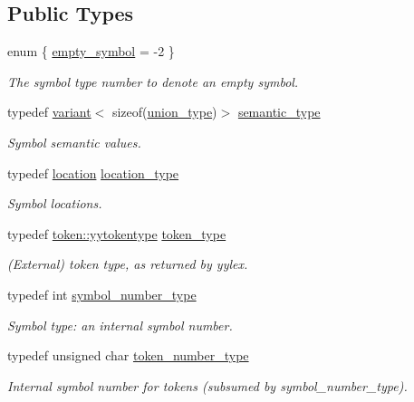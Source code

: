 \subsection*{Public Types}
\begin{DoxyCompactItemize}
\item 
enum \{ \hyperlink{classyy_1_1genesyspp__parser_a5bdf576f03edcaee4e81f263b3ea1f18adf6c33bff5299c5403484f7cbfc4a302}{empty\-\_\-symbol} = -\/2
 \}
\begin{DoxyCompactList}\small\item\em The symbol type number to denote an empty symbol. \end{DoxyCompactList}\item 
typedef \hyperlink{structyy_1_1variant}{variant}$<$ sizeof(\hyperlink{unionyy_1_1genesyspp__parser_1_1union__type}{union\-\_\-type})$>$ \hyperlink{classyy_1_1genesyspp__parser_a592978b9aaaa0d61f9faf4093f5f554d}{semantic\-\_\-type}
\begin{DoxyCompactList}\small\item\em Symbol semantic values. \end{DoxyCompactList}\item 
typedef \hyperlink{classyy_1_1location}{location} \hyperlink{classyy_1_1genesyspp__parser_aa0276d3782ebff157827ad5e7d44f97c}{location\-\_\-type}
\begin{DoxyCompactList}\small\item\em Symbol locations. \end{DoxyCompactList}\item 
typedef \hyperlink{structyy_1_1genesyspp__parser_1_1token_a473652e1e69da7c38a16e5d2aaac94b9}{token\-::yytokentype} \hyperlink{classyy_1_1genesyspp__parser_a12db38f833589f8357b8443818db9514}{token\-\_\-type}
\begin{DoxyCompactList}\small\item\em (External) token type, as returned by yylex. \end{DoxyCompactList}\item 
typedef int \hyperlink{classyy_1_1genesyspp__parser_a0910f625bff73225656c83490dd5fe9f}{symbol\-\_\-number\-\_\-type}
\begin{DoxyCompactList}\small\item\em Symbol type\-: an internal symbol number. \end{DoxyCompactList}\item 
typedef unsigned char \hyperlink{classyy_1_1genesyspp__parser_aa489989bd38c35b366db6b5be5083bcf}{token\-\_\-number\-\_\-type}
\begin{DoxyCompactList}\small\item\em Internal symbol number for tokens (subsumed by symbol\-\_\-number\-\_\-type). \end{DoxyCompactList}\item 

\end{DoxyCompactItemize}
